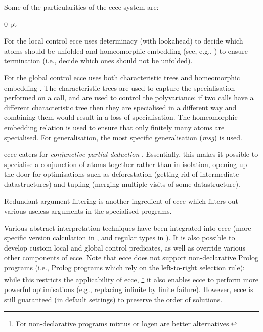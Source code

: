\documentclass{sig-alternate}
\newenvironment{zitemize}%
   {\begin{list}{--}{
   \setlength{\itemsep}{0 pt}
   \setlength{\parsep}{0 pt}
   \setlength{\topsep} {0 pt} }}%
   {\end{list}}
\begin{document}
Some of the particularities of the {\sc ecce} system are:
\begin{zitemize}
\item For the local control {\sc ecce} uses determinacy (with lookahead) to decide
 which atoms should be unfolded
 and homeomorphic embedding  (see, e.g., \cite{Leuschel:NeilFest02}) to ensure
 termination (i.e., decide which ones should not be unfolded).
 \item For the global control {\sc ecce} uses both characteristic trees and homeomorphic embedding
  \cite{LeuschelMartens:Dagstuhl96,LeuschelMartensDeSchreye:Toplas}.
  The characteristic trees \cite{Gallagher91:ngc}
   are used to capture the specialisation performed
   on a call, and are used to control the polyvariance: if two calls have a different
    characteristic tree then they are specialised in a different way and combining
    them would result in a loss of specialisation.
   The homeomorphic embedding relation
   is used to ensure that only finitely many atoms are specialised.
   For generalisation, the most specific generalisation ({\em msg}) \cite{LassezMaherMarriott:fddlp88} is used.
 \item {\sc ecce} caters for
  {\em conjunctive partial deduction\/} \cite{LeuschelDeSchreyeDeWaal:JICSLP96,CPD:megapaper}.
  Essentially, this makes it possible to specialise a conjunction of atoms together
   rather than in isolation, opening up the door for optimisations such as
    deforestation (getting rid of intermediate datastructures) and tupling
    (merging multiple visits of some datastructure).
 \item Redundant argument filtering \cite{LeuschelSorensen:RAF} is another
  ingredient of {\sc ecce} which filters out various useless arguments in the
   specialised programs.
\end{zitemize}

Various abstract interpretation techniques have been integrated
 into {\sc ecce}
(more specific version \cite{MarriottNaishLassez:AMAI90} calculation in
\cite{LeuschelDeSchreye:PLILP96}, and regular types in
\cite{LeuschelGruner:LOPSTR2001}).
It is also possible to develop custom local and global control predicates, as well as override
 various other components of {\sc ecce}.
Note that {\sc ecce} does not support non-declarative Prolog programs (i.e., Prolog
 programs which rely on the left-to-right selection rule):
  while this restricts the applicability of {\sc ecce},%
\footnote{For non-declarative programs  {\sc mixtus} \cite{Sahlin93:ngc} or
 {\sc logen}  \cite{LeuschelEtAl:TPLP03} are better alternatives.}
 it also enables {\sc ecce} to perform
  more powerful optimisations (e.g., replacing infinite by finite failure).
 However, {\sc ecce} is still guaranteed (in default settings) to preserve the order of solutions.
\end{document}
